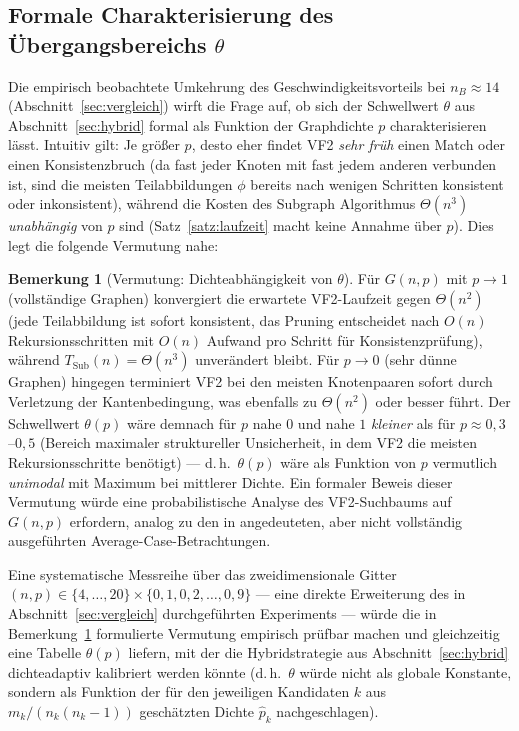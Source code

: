 \documentclass[a4paper,12pt]{article}
\theoremstyle{definition}
\newtheorem{bemerkung}{Bemerkung}
\begin{document}
\subsection{Formale Charakterisierung des Übergangsbereichs $\theta$}
\label{sec:theta}

Die empirisch beobachtete Umkehrung des Geschwindigkeitsvorteils bei $n_B\approx 14$ (Abschnitt~\ref{sec:vergleich}) wirft die Frage auf, ob sich der Schwellwert $\theta$ aus Abschnitt~\ref{sec:hybrid} formal als Funktion der Graphdichte $p$ charakterisieren lässt. Intuitiv gilt: Je größer $p$, desto eher findet VF2 \emph{sehr früh} einen Match oder einen Konsistenzbruch (da fast jeder Knoten mit fast jedem anderen verbunden ist, sind die meisten Teilabbildungen $\phi$ bereits nach wenigen Schritten konsistent oder inkonsistent), während die Kosten des Subgraph Algorithmus $\Theta(n^3)$ \emph{unabhängig} von $p$ sind (Satz~\ref{satz:laufzeit} macht keine Annahme über $p$). Dies legt die folgende Vermutung nahe:

\begin{bemerkung}[Vermutung: Dichteabhängigkeit von $\theta$]
	\label{bem:theta}
	Für $G(n,p)$ mit $p\to 1$ (vollständige Graphen) konvergiert die erwartete VF2-Laufzeit gegen $\Theta(n^2)$ (jede Teilabbildung ist sofort konsistent, das Pruning entscheidet nach $O(n)$ Rekursionsschritten mit $O(n)$ Aufwand pro Schritt für Konsistenzprüfung), während $T_{\text{Sub}}(n)=\Theta(n^3)$ unverändert bleibt. Für $p\to 0$ (sehr dünne Graphen) hingegen terminiert VF2 bei den meisten Knotenpaaren sofort durch Verletzung der Kantenbedingung, was ebenfalls zu $\Theta(n^2)$ oder besser führt. Der Schwellwert $\theta(p)$ wäre demnach für $p$ nahe $0$ und nahe $1$ \emph{kleiner} als für $p\approx 0{,}3$--$0{,}5$ (Bereich maximaler struktureller Unsicherheit, in dem VF2 die meisten Rekursionsschritte benötigt) — d.\,h.\ $\theta(p)$ wäre als Funktion von $p$ vermutlich \emph{unimodal} mit Maximum bei mittlerer Dichte. Ein formaler Beweis dieser Vermutung würde eine probabilistische Analyse des VF2-Suchbaums auf $G(n,p)$ erfordern, analog zu den in \cite{cordella2004} angedeuteten, aber nicht vollständig ausgeführten Average-Case-Betrachtungen.
\end{bemerkung}

Eine systematische Messreihe über das zweidimensionale Gitter $(n,p)\in\{4,\ldots,20\}\times\{0{,}1,0{,}2,\ldots,0{,}9\}$ — eine direkte Erweiterung des in Abschnitt~\ref{sec:vergleich} durchgeführten Experiments — würde die in Bemerkung~\ref{bem:theta} formulierte Vermutung empirisch prüfbar machen und gleichzeitig eine Tabelle $\theta(p)$ liefern, mit der die Hybridstrategie aus Abschnitt~\ref{sec:hybrid} dichteadaptiv kalibriert werden könnte (d.\,h.\ $\theta$ würde nicht als globale Konstante, sondern als Funktion der für den jeweiligen Kandidaten $k$ aus $m_k/(n_k(n_k-1))$ geschätzten Dichte $\hat p_k$ nachgeschlagen).
\end{document}
